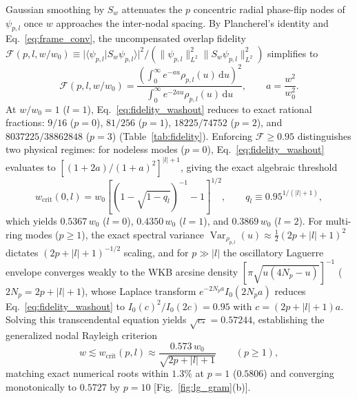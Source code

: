 \documentclass{optica-article}
\newcommand{\braket}[2]{\langle #1 | #2 \rangle}
\newcommand{\norm}[1]{\lVert #1 \rVert}
\newcommand{\abs}[1]{\lvert #1 \rvert}
\newcommand{\dd}{\mathrm{d}}
\begin{document}
Gaussian smoothing by $S_w$ attenuates the $p$ concentric radial phase-flip nodes of $\psi_{p,l}$ once $w$ approaches the inter-nodal spacing. By Plancherel's identity and Eq.~\eqref{eq:frame_conv}, the uncompensated overlap fidelity $\mathcal{F}(p,l,w/w_0) \equiv \allowbreak \abs{\braket{\psi_{p,l}}{S_w\psi_{p,l}}}^2 / \allowbreak (\norm{\psi_{p,l}}_{L^2}^2\norm{S_w\psi_{p,l}}_{L^2}^2)$ simplifies to
\begin{equation}
  \mathcal{F}(p,l,w/w_0) = \frac{\left(\int_0^\infty e^{-au}\rho_{p,l}(u)\,\dd u\right)^2}{\int_0^\infty e^{-2au}\rho_{p,l}(u)\,\dd u}, \qquad a = \frac{w^2}{w_0^2}.
  \label{eq:fidelity_washout}
\end{equation}
At $w/w_0 = 1$ ($l = 1$), Eq.~\eqref{eq:fidelity_washout} reduces to exact rational fractions: $9/16$ ($p=0$), $81/256$ ($p=1$), $18225/74752$ ($p=2$), and $8037225/38862848$ ($p=3$) (Table~\ref{tab:fidelity}). Enforcing $\mathcal{F} \ge 0.95$ distinguishes two physical regimes: for nodeless modes ($p = 0$), Eq.~\eqref{eq:fidelity_washout} evaluates to $[(1+2a)/(1+a)^2]^{\abs{l}+1}$, giving the exact algebraic threshold
\begin{equation}
  w_{\mathrm{crit}}(0,l) = w_0\left[\left(1 - \sqrt{1 - q_l}\right)^{-1} - 1\right]^{1/2}, \qquad q_l \equiv 0.95^{1/(\abs{l}+1)},
  \label{eq:wcrit_p0}
\end{equation}
which yields $0.5367\,w_0$ ($l=0$), $0.4350\,w_0$ ($l=1$), and $0.3869\,w_0$ ($l=2$). For multi-ring modes ($p \ge 1$), the exact spectral variance $\operatorname{Var}_{\rho_{p,l}}(u) \approx \frac{1}{2}(2p+\abs{l}+1)^2$ dictates $(2p+\abs{l}+1)^{-1/2}$ scaling, and for $p \gg \abs{l}$ the oscillatory Laguerre envelope converges weakly to the WKB arcsine density $[\pi\sqrt{u(4N_p - u)}]^{-1}$ ($2N_p = 2p+\abs{l}+1$), whose Laplace transform $e^{-2N_p a}I_0(2N_p a)$ reduces Eq.~\eqref{eq:fidelity_washout} to $I_0(c)^2/I_0(2c) = 0.95$ with $c = (2p+\abs{l}+1)a$. Solving this transcendental equation yields $\sqrt{c_*} = 0.57244$, establishing the generalized nodal Rayleigh criterion
\begin{equation}
  w \lesssim w_{\mathrm{crit}}(p,l) \approx \frac{0.573\,w_0}{\sqrt{2p + \abs{l} + 1}} \qquad (p \ge 1),
  \label{eq:wcrit_pge1}
\end{equation}
matching exact numerical roots within $1.3\%$ at $p = 1$ ($0.5806$) and converging monotonically to $0.5727$ by $p = 10$ [Fig.~\ref{fig:lg_gram}(b)].
\end{document}
